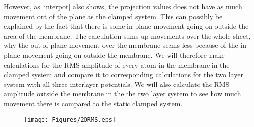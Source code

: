 However, as \cref{interpot} also shows, the projection values does not have as much movement out of the plane as the clamped system. This can possibly be explained by the fact that there is some in-plane movement going on outside the area of the membrane. The calculation sums up movements over the whole sheet, why the out of plane movement over the membrane seems less because of the in-plane movement going on outside the membrane. We will therefore make calculations for the RMS-amplitude of every atom in the membrane in the clamped system and compare it to corresponding calculations for the two layer system with all three interlayer potentials. We will also calculate the RMS-amplitude outside the membrane in the the two layer system to see how much movement there is compared to the static clamped system. 

\onecolumngrid

\begin{figure}[H]
    \centering
    \texttt{[image: Figures/2DRMS.eps]}
    \caption{}
    \label{2DRMS}
\end{figure}
\twocolumngrid